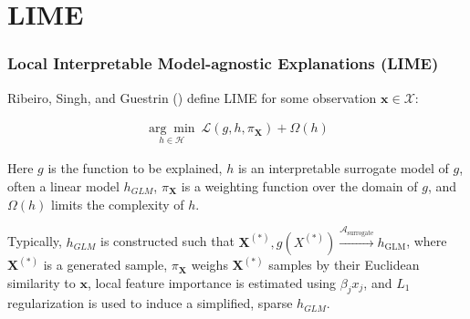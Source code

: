 \documentclass[11pt,
               aspectratio=169
               ]{beamer}
\begin{document}
	\section{LIME}

		\begin{frame}
		
			\frametitle{Local Interpretable Model-agnostic Explanations (LIME)}
			
				Ribeiro, Singh, and Guestrin (\citeyear{lime}) define LIME for some observation $\mathbf{x} \in \mathcal{X}$:
			
				\begin{equation*}
					\begin{aligned}
						\underset{h \in \mathcal{H}}{\arg\min}\:\mathcal{L}(g, h, \pi_{\mathbf{X}}) + \Omega(h)
					\end{aligned}
				\end{equation*}
			
				Here $g$ is the function to be explained, $h$ is an interpretable surrogate model of $g$, often a linear model $h_{GLM}$, $\pi_{\mathbf{X}}$ is a weighting function over the domain of $g$, and $\Omega(h)$ limits the complexity of $h$.
			
				\vspace{5pt}
			
				Typically, $h_{GLM}$ is constructed such that $\mathbf{X}^{(*)}, g({X}^{(*)}) \xrightarrow{\mathcal{A}_{\text{surrogate}}} h_{\text{GLM}}$, where $\mathbf{X}^{(*)}$ is a generated sample, $\pi_{\mathbf{X}}$ weighs $\mathbf{X}^{(*)}$ samples by their Euclidean similarity to $\mathbf{x}$, local feature importance is estimated using $\beta_j x_j$, and $L_1$ regularization is used to induce a simplified, sparse $h_{GLM}$. 		
			
			
		\end{frame}
	
\end{document}
